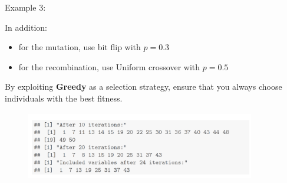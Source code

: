 \documentclass[11pt,compress,t,notes=noshow, xcolor=table]{beamer}
\begin{document}
\begin{vbframe}{Example 3:}





In addition:

\begin{itemize}
\item for the mutation, use bit flip with $p = 0.3$
\item for the recombination, use Uniform crossover with $p=0.5$
\end{itemize}

\lz

By exploiting \textbf{Greedy} as a selection strategy, ensure that you always choose individuals with the best fitness. 








\vspace{0.5cm}
\begin{center}
\begin{figure}
  \includegraphics[height = 3cm, width = 10cm]{figure_man/example3.png}
\end{figure}
\end{center}





\end{vbframe}
\end{document}
